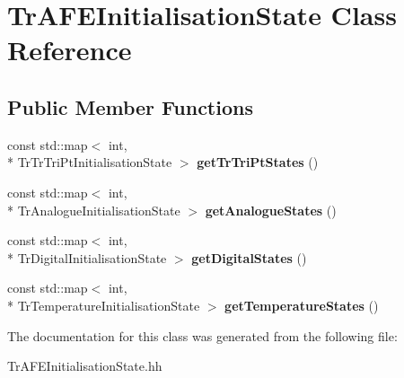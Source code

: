 \hypertarget{classTrAFEInitialisationState}{\section{Tr\-A\-F\-E\-Initialisation\-State Class Reference}
\label{classTrAFEInitialisationState}
}
\subsection*{Public Member Functions}
\begin{DoxyCompactItemize}
\item 
\hypertarget{classTrAFEInitialisationState_ad017ebaabc8dedbdd26a141478d0cd60}{const std\-::map$<$ int, \\*
Tr\-Tr\-Tri\-Pt\-Initialisation\-State $>$ {\bfseries get\-Tr\-Tri\-Pt\-States} ()}\label{classTrAFEInitialisationState_ad017ebaabc8dedbdd26a141478d0cd60}

\item 
\hypertarget{classTrAFEInitialisationState_a786f54b7f56be010f0db7c1e8fb5396f}{const std\-::map$<$ int, \\*
Tr\-Analogue\-Initialisation\-State $>$ {\bfseries get\-Analogue\-States} ()}\label{classTrAFEInitialisationState_a786f54b7f56be010f0db7c1e8fb5396f}

\item 
\hypertarget{classTrAFEInitialisationState_ab032a6df96d550191d0c209cc1d32445}{const std\-::map$<$ int, \\*
Tr\-Digital\-Initialisation\-State $>$ {\bfseries get\-Digital\-States} ()}\label{classTrAFEInitialisationState_ab032a6df96d550191d0c209cc1d32445}

\item 
\hypertarget{classTrAFEInitialisationState_ae37a1c98b61b17088436927deb99a68f}{const std\-::map$<$ int, \\*
Tr\-Temperature\-Initialisation\-State $>$ {\bfseries get\-Temperature\-States} ()}\label{classTrAFEInitialisationState_ae37a1c98b61b17088436927deb99a68f}

\end{DoxyCompactItemize}


The documentation for this class was generated from the following file\-:\begin{DoxyCompactItemize}
\item 
Tr\-A\-F\-E\-Initialisation\-State.\-hh\end{DoxyCompactItemize}
